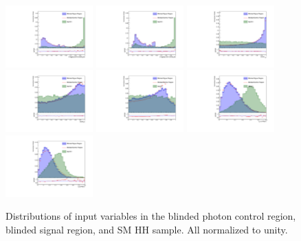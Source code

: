 \begin{figure}[h]
  \centering
  \includegraphics[width=0.3\textwidth]{figures/sec-cats/mva/ljbdis}\hfil
  \includegraphics[width=0.3\textwidth]{figures/sec-cats/mva/sjbdis}\hfil
  \includegraphics[width=0.3\textwidth]{figures/sec-cats/mva/cts_cs}\hfil
  \includegraphics[width=0.3\textwidth]{figures/sec-cats/mva/ct_bb}\hfil
  \includegraphics[width=0.3\textwidth]{figures/sec-cats/mva/ct_gg}\hfil
  \includegraphics[width=0.3\textwidth]{figures/sec-cats/mva/gghhr}\hfil
  \includegraphics[width=0.3\textwidth]{figures/sec-cats/mva/bbhhr}\hfil
  \caption{Distributions of input variables in the blinded photon control region, blinded signal region, and SM HH sample. All normalized to unity. }
  \label{fig:inputmva}
\end{figure}

